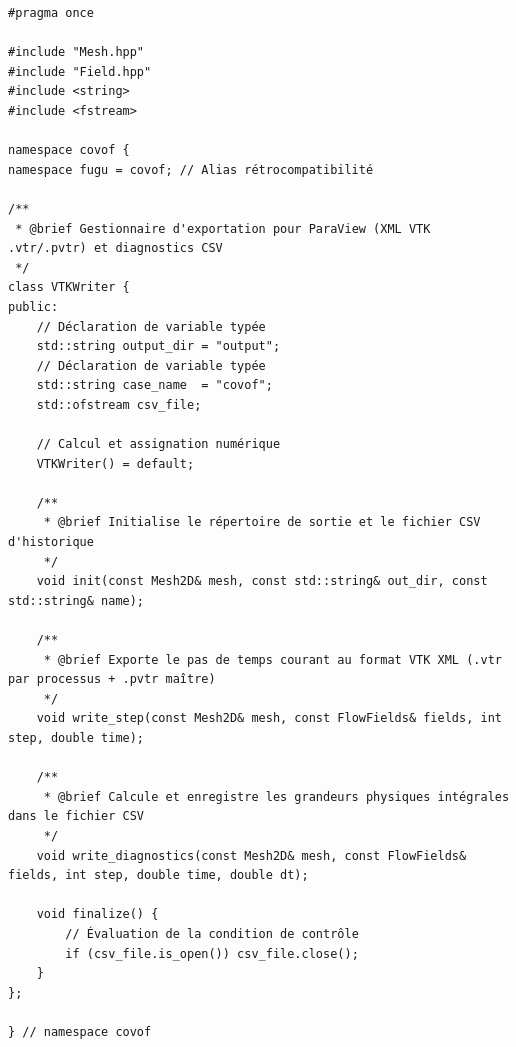 \documentclass[10pt,a4paper,oneside]{book}
\begin{document}
\begin{lstlisting}[language={[11]C++}]
#pragma once

#include "Mesh.hpp"
#include "Field.hpp"
#include <string>
#include <fstream>

namespace covof {
namespace fugu = covof; // Alias rétrocompatibilité

/**
 * @brief Gestionnaire d'exportation pour ParaView (XML VTK .vtr/.pvtr) et diagnostics CSV
 */
class VTKWriter {
public:
    // Déclaration de variable typée
    std::string output_dir = "output";
    // Déclaration de variable typée
    std::string case_name  = "covof";
    std::ofstream csv_file;

    // Calcul et assignation numérique
    VTKWriter() = default;

    /**
     * @brief Initialise le répertoire de sortie et le fichier CSV d'historique
     */
    void init(const Mesh2D& mesh, const std::string& out_dir, const std::string& name);

    /**
     * @brief Exporte le pas de temps courant au format VTK XML (.vtr par processus + .pvtr maître)
     */
    void write_step(const Mesh2D& mesh, const FlowFields& fields, int step, double time);

    /**
     * @brief Calcule et enregistre les grandeurs physiques intégrales dans le fichier CSV
     */
    void write_diagnostics(const Mesh2D& mesh, const FlowFields& fields, int step, double time, double dt);

    void finalize() {
        // Évaluation de la condition de contrôle
        if (csv_file.is_open()) csv_file.close();
    }
};

} // namespace covof

\end{lstlisting}
\end{document}
